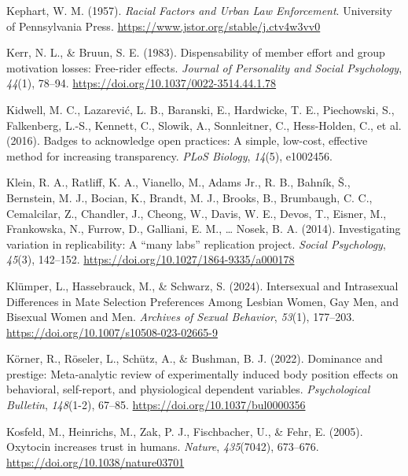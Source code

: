 \documentclass[
  letterpaper,
]{book}
\newlength{\cslhangindent}
\newenvironment{CSLReferences}[2] %
 {\begin{list}{}{%
  \setlength{\itemindent}{0pt}
  \setlength{\leftmargin}{0pt}
  \setlength{\parsep}{0pt}
  \ifodd #1
   \setlength{\leftmargin}{\cslhangindent}
   \setlength{\itemindent}{-1\cslhangindent}
  \fi
  \setlength{\itemsep}{#2\baselineskip}}}
 {\end{list}}
\begin{document}
\begin{CSLReferences}{1}{0}
Kephart, W. M. (1957). \emph{Racial {Factors} and {Urban} {Law}
{Enforcement}}. University of Pennsylvania Press.
\url{https://www.jstor.org/stable/j.ctv4w3vv0}

Kerr, N. L., \& Bruun, S. E. (1983). Dispensability of member effort and
group motivation losses: {Free}-rider effects. \emph{Journal of
Personality and Social Psychology}, \emph{44}(1), 78--94.
\url{https://doi.org/10.1037/0022-3514.44.1.78}

Kidwell, M. C., Lazarević, L. B., Baranski, E., Hardwicke, T. E.,
Piechowski, S., Falkenberg, L.-S., Kennett, C., Slowik, A., Sonnleitner,
C., Hess-Holden, C., et al. (2016). Badges to acknowledge open
practices: A simple, low-cost, effective method for increasing
transparency. \emph{PLoS Biology}, \emph{14}(5), e1002456.

Klein, R. A., Ratliff, K. A., Vianello, M., Adams Jr., R. B., Bahník,
Š., Bernstein, M. J., Bocian, K., Brandt, M. J., Brooks, B., Brumbaugh,
C. C., Cemalcilar, Z., Chandler, J., Cheong, W., Davis, W. E., Devos,
T., Eisner, M., Frankowska, N., Furrow, D., Galliani, E. M., \ldots{}
Nosek, B. A. (2014). Investigating variation in replicability: {A}
{``many labs''} replication project. \emph{Social Psychology},
\emph{45}(3), 142--152. \url{https://doi.org/10.1027/1864-9335/a000178}

Klümper, L., Hassebrauck, M., \& Schwarz, S. (2024). Intersexual and
{Intrasexual} {Differences} in {Mate} {Selection} {Preferences} {Among}
{Lesbian} {Women}, {Gay} {Men}, and {Bisexual} {Women} and {Men}.
\emph{Archives of Sexual Behavior}, \emph{53}(1), 177--203.
\url{https://doi.org/10.1007/s10508-023-02665-9}

Körner, R., Röseler, L., Schütz, A., \& Bushman, B. J. (2022). Dominance
and prestige: {Meta}-analytic review of experimentally induced body
position effects on behavioral, self-report, and physiological dependent
variables. \emph{Psychological Bulletin}, \emph{148}(1-2), 67--85.
\url{https://doi.org/10.1037/bul0000356}

Kosfeld, M., Heinrichs, M., Zak, P. J., Fischbacher, U., \& Fehr, E.
(2005). Oxytocin increases trust in humans. \emph{Nature},
\emph{435}(7042), 673--676. \url{https://doi.org/10.1038/nature03701}


\end{CSLReferences}
\end{document}
